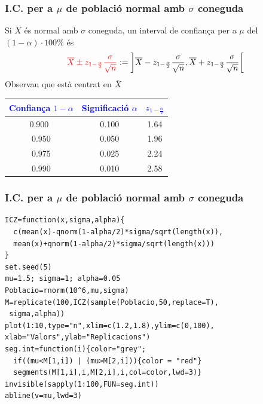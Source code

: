 \documentclass[12pt,t]{beamer}
\newcommand{\red}[1]{\textcolor{red}{#1}}
\newcommand{\blue}[1]{\textcolor{blue}{#1}}
\theoremstyle{plain}
\theoremstyle{definition}
\begin{document}
\begin{frame}
\frametitle{I.C. per a $\mu$ de població normal amb $\sigma$ coneguda}

Si $X$ és normal amb $\sigma$ coneguda, un interval de confiança per a $\mu$ del $(1-\alpha)\cdot 100\%$ és 
$$
\red{\overline{X} \pm z_{1-\frac{\alpha}{2}} \frac{\sigma}{\sqrt{n}}}:=\left]\overline{X} -z_{1-\frac{\alpha}{2}} \frac{\sigma}{\sqrt{n}}, \overline{X}+z_{1-\frac{\alpha}{2}}\frac{\sigma}{\sqrt{n}}
\right[
$$
Observau que està centrat en $\overline{X}$
\begin{center}
\begin{tabular}{c|c|c}
\blue{Confiança $1-\alpha$} & \blue{Significació $\alpha$} & \blue{$z_{1-\frac{\alpha}{2}}$}\\
 \hline
0.900\ & 0.100 &1.64 \\   
0.950 & 0.050 & 1.96\\
0.975 & 0.025 & 2.24 \\
0.990 & 0.010 & 2.58
\end{tabular}
\end{center}


\end{frame}

\begin{frame}[fragile]
\frametitle{I.C. per a $\mu$ de població normal amb $\sigma$ coneguda}
\vspace*{-3ex}

\small
\begin{verbatim}
ICZ=function(x,sigma,alpha){
  c(mean(x)-qnorm(1-alpha/2)*sigma/sqrt(length(x)), 
  mean(x)+qnorm(1-alpha/2)*sigma/sqrt(length(x)))
}
set.seed(5)
mu=1.5; sigma=1; alpha=0.05
Poblacio=rnorm(10^6,mu,sigma)
M=replicate(100,ICZ(sample(Poblacio,50,replace=T),
 sigma,alpha))
plot(1:10,type="n",xlim=c(1.2,1.8),ylim=c(0,100),
xlab="Valors",ylab="Replicacions")
seg.int=function(i){color="grey";
  if((mu<M[1,i]) | (mu>M[2,i])){color = "red"}
  segments(M[1,i],i,M[2,i],i,col=color,lwd=3)}
invisible(sapply(1:100,FUN=seg.int))
abline(v=mu,lwd=3)
\end{verbatim}
\end{frame}
\end{document}
